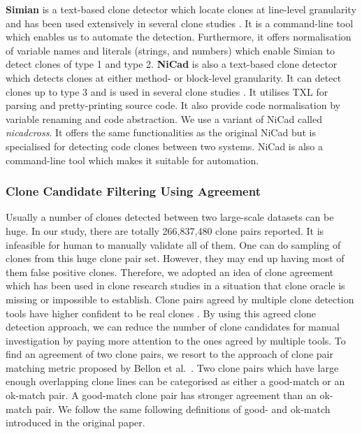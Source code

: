 \documentclass{sig-alternate-05-2015}
\begin{document}
\textbf{Simian} is a text-based clone detector which locate clones at line-level granularity and has been used extensively in several clone studies \cite{Ragkhitwetsagul2016, Wang2013, Mondal2011, Cheung2015, Krinke2010}. It is a command-line tool which enables us to automate the detection. Furthermore, it offers normalisation of variable names and literals (strings, and numbers) which enable Simian to detect clones of type 1 and type 2. \textbf{NiCad} is also a text-based clone detector which detects clones at either method- or block-level granularity. It can detect clones up to type 3 and is used in several clone studies \cite{Roy2008, Ragkhitwetsagul2016, Svajlenko2014, Wang2013, Mondal2011, Sajnani2016}. It utilises TXL for parsing and pretty-printing source code. It also provide code normalisation by variable renaming and code abstraction. We use a variant of NiCad called \textit{nicadcross}. It offers the same functionalities as the original NiCad but is specialised for detecting code clones between two systems. NiCad is also a command-line tool which makes it suitable for automation.

\subsubsection{Clone Candidate Filtering Using Agreement}
Usually a number of clones detected between two large-scale datasets  can be huge. In our study, there are totally 266,837,480 clone pairs reported. It is infeasible for human to manually validate all of them. One can do sampling of clones from this huge clone pair set. However, they may end up having most of them false positive clones. Therefore, we adopted an idea of clone agreement which has been used in clone research studies \cite{Wang2013,Funaro2010,cr2016ssbse} in a situation that clone oracle is missing or impossible to establish. Clone pairs agreed by multiple clone detection tools have higher confident to be real clones \cite{cr2016ssbse}. By using this agreed clone detection approach, we can reduce the number of clone candidates for manual investigation by paying more attention to the ones agreed by multiple tools. To find an agreement of two clone pairs, we resort to the approach of clone pair matching metric proposed by Bellon et al.~\cite{Bellon2007}. Two clone pairs which have large enough overlapping clone lines can be categorised as either a good-match or an ok-match pair. A good-match clone pair has stronger agreement than an ok-match pair. We follow the same following definitions of good- and ok-match introduced in the original paper.
\end{document}
